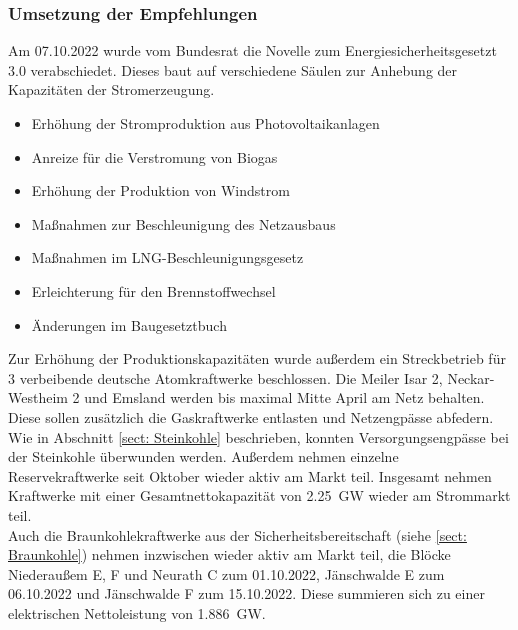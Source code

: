 		\subsubsection{Umsetzung der Empfehlungen} \label{sect: Atomausstieg}
		Am 07.10.2022 wurde vom Bundesrat die Novelle zum Energiesicherheitsgesetzt 3.0 verabschiedet. Dieses baut auf verschiedene Säulen zur Anhebung der Kapazitäten der Stromerzeugung. 
			\begin{itemize}
				\item Erhöhung der Stromproduktion aus Photovoltaikanlagen
				\item Anreize für die Verstromung von Biogas
				\item Erhöhung der Produktion von Windstrom
				\item Maßnahmen zur Beschleunigung des Netzausbaus
				\item Maßnahmen im LNG-Beschleunigungsgesetz
				\item Erleichterung für den Brennstoffwechsel
				\item Änderungen im Baugesetztbuch
			\end{itemize}
		
		Zur Erhöhung der Produktionskapazitäten wurde außerdem ein Streckbetrieb für 3 verbeibende deutsche Atomkraftwerke beschlossen. Die Meiler Isar 2, Neckar-Westheim 2 und Emsland werden bis maximal Mitte April am Netz behalten. Diese sollen zusätzlich die Gaskraftwerke entlasten und Netzengpässe abfedern.\\
		Wie in Abschnitt \ref{sect: Steinkohle} beschrieben, konnten Versorgungsengpässe bei der Steinkohle überwunden werden. Außerdem nehmen einzelne Reservekraftwerke seit Oktober wieder aktiv am Markt teil. Insgesamt nehmen Kraftwerke mit einer Gesamtnettokapazität von \SI{2,25}{\giga \watt} wieder am Strommarkt teil.\\
		Auch die Braunkohlekraftwerke aus der Sicherheitsbereitschaft (siehe \ref{sect: Braunkohle}) nehmen inzwischen wieder aktiv am Markt teil, die Blöcke Niederaußem E, F und Neurath C zum 01.10.2022, Jänschwalde E zum 06.10.2022 und Jänschwalde F zum 15.10.2022. Diese summieren sich zu einer elektrischen Nettoleistung von \SI{1,886}{\giga \watt}.\\
		
		
